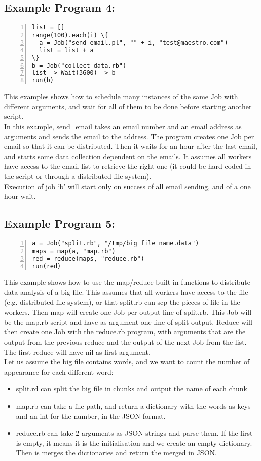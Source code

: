 \subsection*{Example Program 4:}
\begin{Verbatim}[numbers=left,commandchars=\\\{\}]
list = []
range(100).each(i) \{
  a = Job("send_email.pl", "" + i, "test@maestro.com")
  list = list + a
\}
b = Job("collect_data.rb")
list -> Wait(3600) -> b
run(b)
\end{Verbatim}

This examples shows how to schedule many instances of the same Job with different
arguments, and wait for all of them to be done before starting another script.\\
In this example, send\_email takes an email number and an email address as arguments
and sends the email to the address. The program creates one Job per email so that it
can be distributed. Then it waits for an hour after the last email, and starts some data
collection dependent on the emails. It assumes all workers have access to the email list
to retrieve the right one (it could be hard coded in the script or through a distributed
file system).\\
Execution of job `b' will start only on success of all email sending,
and of a one hour wait.

\subsection*{Example Program 5:}
\begin{Verbatim}[numbers=left,commandchars=\\\{\}]
a = Job("split.rb", "/tmp/big_file_name.data")
maps = map(a, "map.rb")
red = reduce(maps, "reduce.rb")
run(red)
\end{Verbatim}

This example shows how to use the map/reduce built in functions to distribute data
analysis of a big file. This assumes that all workers have access to the file (e.g.
distributed file system), or that split.rb can scp the pieces of file in the workers.
Then map will create one Job per output line of split.rb. This Job will be the map.rb
script and have as argument one line of split output. Reduce will then create one Job
with the reduce.rb program, with arguments that are the output from the previous reduce and
the output of the next Job from the list. The first reduce will have nil as first argument.\\
Let us assume the big file contains words, and we want to count the number of appearance for
each different word:
\begin{itemize}
  \item split.rd can split the big file in chunks and output the name of each chunk
  \item map.rb can take a file path, and return a dictionary with the words as keys
    and an int for the number, in the JSON format.
  \item reduce.rb can take 2 arguments as JSON strings and parse them. If the first is
    empty, it means it is the initialisation and we create an empty dictionary. Then is
    merges the dictionaries and return the merged in JSON.
\end{itemize}
